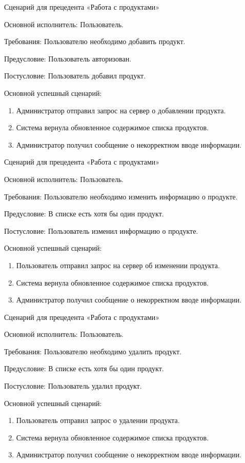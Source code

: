 Сценарий для прецедента «Работа с продуктами»

Основной исполнитель: Пользователь.

Требования: Пользователю необходимо добавить продукт.

Предусловие: Пользователь авторизован.

Постусловие: Пользователь добавил продукт.

Основной успешный сценарий:
\begin{enumerate}
	\item Администратор отправил запрос на сервер о добавлении продукта.
	\item Система вернула обновленное содержимое списка продуктов.
	\item Администратор получил сообщение о некорректном вводе информации.\\
\end{enumerate}

Сценарий для прецедента «Работа с продуктами»

Основной исполнитель: Пользователь.

Требования: Пользователю необходимо изменить информацию о продукте.

Предусловие: В списке есть хотя бы один продукт.

Постусловие: Пользователь изменил информацию о продукте.

Основной успешный сценарий:
\begin{enumerate}
	\item Пользователь отправил запрос на сервер об изменении продукта.
	\item Система вернула обновленное содержимое списка продуктов.
	\item Администратор получил сообщение о некорректном вводе информации.\\
\end{enumerate}

Сценарий для прецедента «Работа с продуктами»

Основной исполнитель: Пользователь.

Требования: Пользователю необходимо удалить продукт.

Предусловие: В списке есть хотя бы один продукт.

Постусловие: Пользователь удалил продукт.

Основной успешный сценарий:
\begin{enumerate}
	\item Пользователь отправил запрос о удалении продукта.
	\item Система вернула обновленное содержимое списка продуктов.
	\item Администратор получил сообщение о некорректном вводе информации.\\
\end{enumerate}


